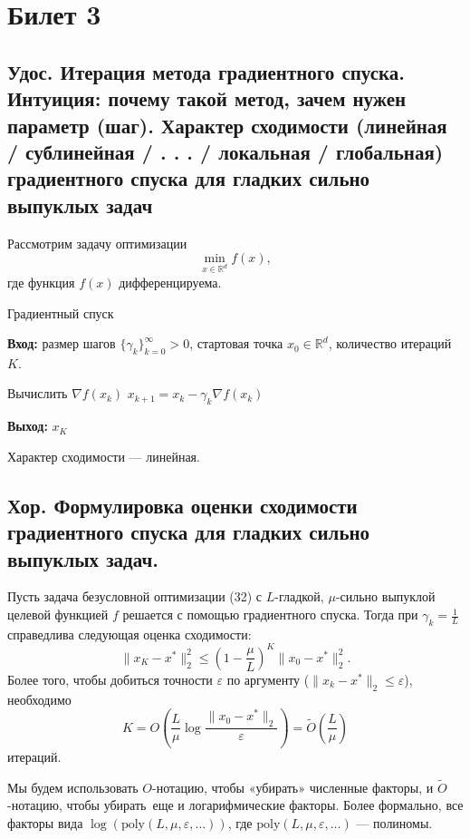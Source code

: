 \section{Билет 3}

\subsection{Удос. Итерация метода градиентного спуска. Интуиция: почему такой метод,
    зачем нужен параметр (шаг). Характер сходимости (линейная / сублинейная
    / . . . / локальная / глобальная) градиентного спуска для гладких
    сильно выпуклых задач}

Рассмотрим задачу оптимизации $$\min_{x \in \mathbb{R}^d} f(x),$$ где функция $f(x)$ дифференцируема.

\begin{algorithm}[ht]
    \caption{Градиентный спуск}
    \textbf{Вход:} размер шагов $\{\gamma_k\}_{k=0}^{\infty} > 0$, стартовая точка $x_0 \in \mathbb{R}^d$, количество итераций $K$.
    \begin{algorithmic}[1]
        \State Вычислить $\nabla f(x_k)$
        \State $x_{k+1} = x_k - \gamma_k \nabla f(x_k)$
        \EndFor
    \end{algorithmic}
    \textbf{Выход:} $x_K$
\end{algorithm}

Характер сходимости --- линейная.

\subsection{Хор. Формулировка оценки сходимости градиентного спуска для гладких сильно выпуклых задач.}

\begin{theorem}
    Пусть задача безусловной оптимизации (32) с $L$-гладкой, $\mu$-сильно выпуклой целевой функцией $f$ решается 
    с помощью градиентного спуска. Тогда при $\gamma_k = \frac{1}{L}$ справедлива следующая оценка сходимости:
    $$\|x_K - x^*\|_2^2 \leq \left( 1 - \frac{\mu}{L} \right)^K \|x_0 - x^*\|_2^2.$$
    Более того, чтобы добиться точности $\varepsilon$ по аргументу ($\|x_k - x^*\|_2 \leq \varepsilon$), необходимо
    $$K = O\left( \frac{L}{\mu} \log \frac{\|x_0 - x^*\|_2}{\varepsilon} \right) = \tilde{O}\left( \frac{L}{\mu} \right)$$
    итераций.

\end{theorem}

\begin{note}
    Мы будем использовать $O$-нотацию, чтобы «убирать» численные факторы, и $\tilde{O}$-нотацию, 
    чтобы \guillemetleft убирать\guillemetright \, еще и логарифмические факторы. Более формально, все факторы вида 
    $\log(\text{poly}(L, \mu, \varepsilon, \dots))$, где $\text{poly}(L, \mu, \varepsilon, \dots)$ --- полиномы.

\end{note}